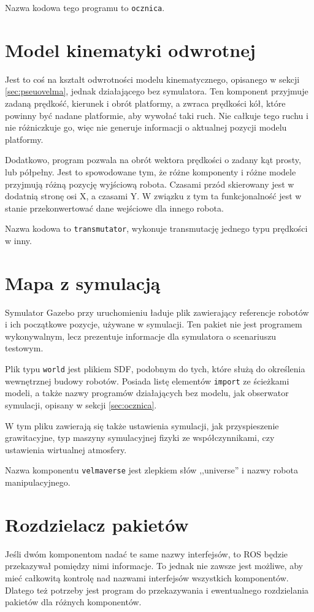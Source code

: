 	Nazwa kodowa tego programu to \texttt{ocznica}.
	
\section{Model kinematyki odwrotnej}
	Jest to coś na kształt odwrotności modelu kinematycznego, opisanego w sekcji \ref{sec:pseuovelma}, jednak działającego bez symulatora.
	Ten komponent przyjmuje zadaną prędkość, kierunek i obrót platformy, a zwraca prędkości kół, które powinny być nadane platformie, aby wywołać taki ruch.
	Nie całkuje tego ruchu i nie różniczkuje go, więc nie generuje informacji o aktualnej pozycji modelu platformy.
	
	
	Dodatkowo, program pozwala na obrót wektora prędkości o zadany kąt prosty, lub półpełny. 
	Jest to spowodowane tym, że różne komponenty i różne modele przyjmują różną pozycję wyjściową robota.
	Czasami przód skierowany jest w dodatnią stronę osi X, a czasami Y. W związku z tym ta funkcjonalność jest w stanie przekonwertować dane wejściowe dla innego robota.
	
	Nazwa kodowa to \texttt{transmutator}, wykonuje transmutację jednego typu prędkości w inny.
	
\section{Mapa z symulacją}
	Symulator Gazebo przy uruchomieniu ładuje plik zawierający referencje robotów i ich początkowe pozycje, używane w symulacji.
	Ten pakiet nie jest programem wykonywalnym, lecz prezentuje informacje dla symulatora o scenariuszu testowym.
	
	Plik typu \texttt{world} jest plikiem SDF, podobnym do tych, które służą do określenia wewnętrznej budowy robotów.
	Posiada listę elementów \texttt{import} ze ścieżkami modeli, a także nazwy programów działających bez modelu, jak obserwator symulacji, opisany w sekcji \ref{sec:ocznica}.

	W tym pliku zawierają się także ustawienia symulacji, jak przyspieszenie grawitacyjne, typ maszyny symulacyjnej fizyki ze współczynnikami, czy ustawienia wirtualnej atmosfery.
	
	Nazwa komponentu \texttt{velmaverse} jest zlepkiem słów ,,universe'' i nazwy robota manipulacyjnego.
	
\section{Rozdzielacz pakietów}
	Jeśli dwóm komponentom nadać te same nazwy interfejsów, to ROS będzie przekazywał pomiędzy nimi informacje.
	To jednak nie zawsze jest możliwe, aby mieć całkowitą kontrolę nad nazwami interfejsów wszystkich komponentów.
	Dlatego też potrzeby jest program do przekazywania i ewentualnego rozdzielania pakietów dla różnych komponentów.
	
